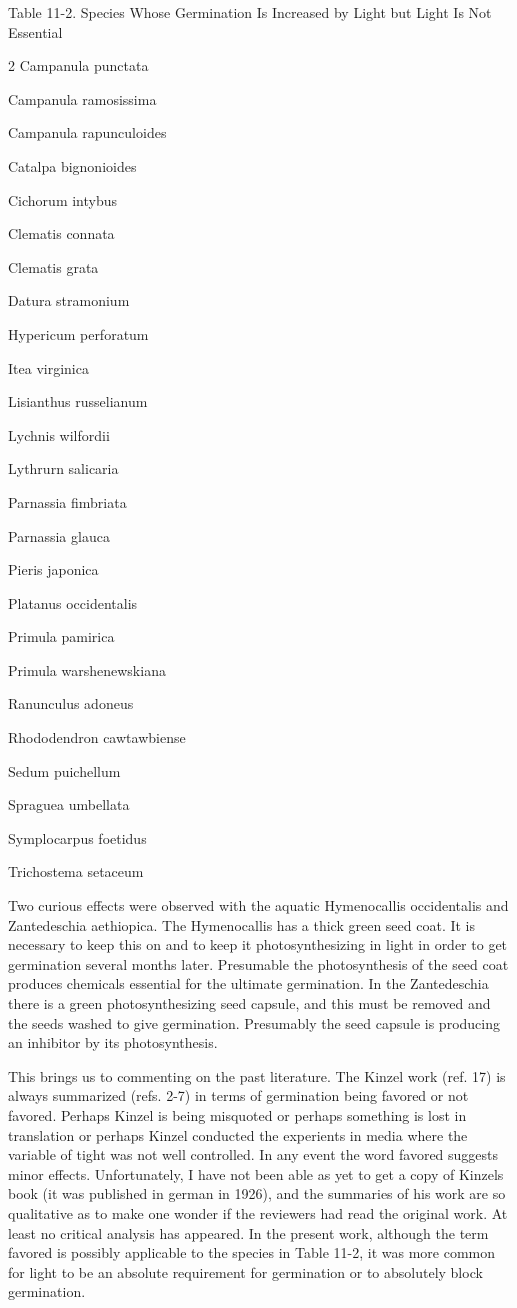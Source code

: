 Table 11-2. Species Whose Germination Is Increased by Light but Light Is Not Essential

\begin{multicols}{2}
Campanula punctata

Campanula ramosissima

Campanula rapunculoides

Catalpa bignonioides

Cichorum intybus

Clematis connata

Clematis grata

Datura stramonium

Hypericum perforatum

Itea virginica

Lisianthus russelianum

Lychnis wilfordii

Lythrurn salicaria

Parnassia fimbriata

Parnassia glauca

Pieris japonica

Platanus occidentalis

Primula pamirica

Primula warshenewskiana

Ranunculus adoneus

Rhododendron cawtawbiense

Sedum puichellum

Spraguea umbellata

Symplocarpus foetidus

Trichostema setaceum
\end{multicols}

Two curious effects were observed with the aquatic Hymenocallis occidentalis
and Zantedeschia aethiopica. The Hymenocallis has a thick green seed coat. It is
necessary to keep this on and to keep it photosynthesizing in light in order to get
germination several months later. Presumable the photosynthesis of the seed coat
produces chemicals essential for the ultimate germination. In the Zantedeschia there
is a green photosynthesizing seed capsule, and this must be removed and the seeds
washed to give germination. Presumably the seed capsule is producing an inhibitor
by its photosynthesis.

This brings us to commenting on the past literature. The Kinzel work (ref. 17) is
always summarized (refs. 2-7) in terms of germination being favored or not favored.
Perhaps Kinzel is being misquoted or perhaps something is lost in translation or
perhaps Kinzel conducted the experients in media where the variable of tight was not
well controlled. In any event the word favored suggests minor effects. Unfortunately, I
have not been able as yet to get a copy of Kinzels book (it was published in german in
1926), and the summaries of his work are so qualitative as to make one wonder if the
reviewers had read the original work. At least no critical analysis has appeared. In the
present work, although the term favored is possibly applicable to the species in Table
11-2, it was more common for light to be an absolute requirement for germination or to
absolutely block germination.

